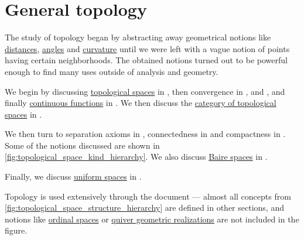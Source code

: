 \section{General topology}\label{sec:general_topology}

The study of topology began by abstracting away geometrical notions like \hyperref[def:metric_space]{distances}, \hyperref[def:angle]{angles} and \hyperref[def:regular_curve_curvature]{curvature} until we were left with a vague notion of points having certain neighborhoods. The obtained notions turned out to be powerful enough to find many uses outside of analysis and geometry.

We begin by discussing \hyperref[def:topological_space]{topological spaces} in , then convergence in ,  and , and finally \hyperref[def:global_continuity]{continuous functions} in . We then discuss the \hyperref[def:category_of_small_topological_spaces]{category of topological spaces} in .

We then turn to separation axioms in , connectedness in  and compactness in . Some of the notions discussed are shown in \cref{fig:topological_space_kind_hierarchy}. We also discuss \hyperref[def:baire_space]{Baire spaces} in .

Finally, we discuss \hyperref[def:uniform_space]{uniform spaces} in .

Topology is used extensively through the document --- almost all concepts from \cref{fig:topological_space_structure_hierarchy} are defined in other sections, and notions like \hyperref[def:ordinal_space]{ordinal spaces} or \hyperref[def:quiver_geometric_realization]{quiver geometric realizations} are not included in the figure.

